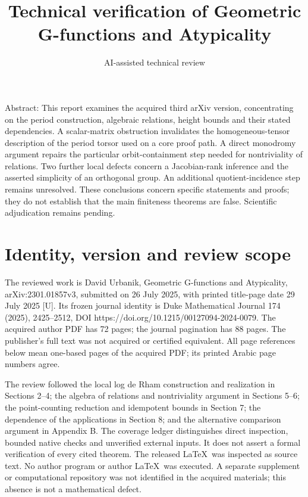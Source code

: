 \documentclass[10pt]{article}
\title{Technical verification of
Geometric G-functions and Atypicality}
\author{AI-assisted technical review}
\date{}
\begin{document}
\maketitle
Abstract: This report examines the acquired third arXiv version, concentrating on the period construction, algebraic relations, height bounds and their stated dependencies. A scalar-matrix obstruction invalidates the homogeneous-tensor description of the period torsor used on a core proof path. A direct monodromy argument repairs the particular orbit-containment step needed for nontriviality of relations. Two further local defects concern a Jacobian-rank inference and the asserted simplicity of an orthogonal group. An additional quotient-incidence step remains unresolved. These conclusions concern specific statements and proofs; they do not establish that the main finiteness theorems are false. Scientific adjudication remains pending.\par
\section*{Identity, version and review scope}
The reviewed work is David Urbanik, Geometric G-functions and Atypicality, arXiv:2301.01857v3, submitted on 26 July 2025, with printed title-page date 29 July 2025 [U]. Its frozen journal identity is Duke Mathematical Journal 174 (2025), 2425–2512, DOI https://doi.org/10.1215/00127094-2024-0079. The acquired author PDF has 72 pages; the journal pagination has 88 pages. The publisher’s full text was not acquired or certified equivalent. All page references below mean one-based pages of the acquired PDF; its printed Arabic page numbers agree.\par
The review followed the local log de Rham construction and realization in Sections 2–4; the algebra of relations and nontriviality argument in Sections 5–6; the point-counting reduction and idempotent bounds in Section 7; the dependence of the applications in Section 8; and the alternative comparison argument in Appendix B. The coverage ledger distinguishes direct inspection, bounded native checks and unverified external inputs. It does not assert a formal verification of every cited theorem. The released LaTeX was inspected as source text. No author program or author LaTeX was executed. A separate supplement or computational repository was not identified in the acquired materials; this absence is not a mathematical defect.\par
\end{document}
